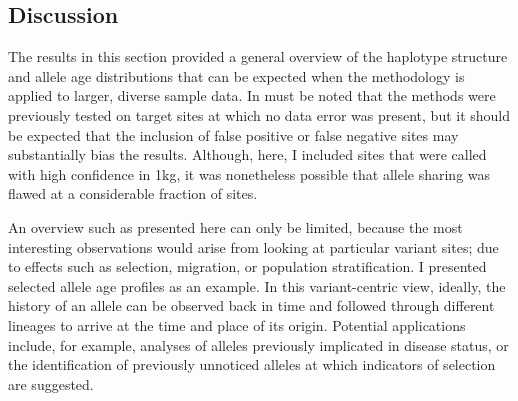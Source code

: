 %
\subsection{Discussion}
%

The results in this section provided a general overview of the haplotype structure and allele age distributions that can be expected when the methodology is applied to larger, diverse sample data.
In must be noted that the methods were previously tested on target sites at which no data error was present, but it should be expected that the inclusion of false positive or false negative sites may substantially bias the results.
Although, here, I included sites that were called with high confidence in \gls{1kg}, it was nonetheless possible that allele sharing was flawed at a considerable fraction of sites.

An overview such as presented here can only be limited, because the most interesting observations would arise from looking at particular variant sites; \eg due to effects such as selection, migration, or population stratification.
I presented selected allele age profiles as an example.
In this variant-centric view, ideally, the history of an allele can be observed back in time and followed through different lineages to arrive at the time and place of its origin.
Potential applications include, for example, analyses of alleles previously implicated in disease status, or the identification of previously unnoticed alleles at which indicators of selection are suggested.

